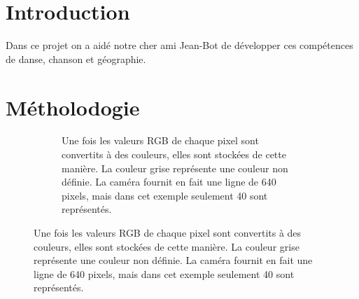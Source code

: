 \documentclass{article}
\begin{document}
    \thispagestyle{empty}

    \tableofcontents

    \newpage

    \setcounter{page}{1}

    \section{Introduction}

    Dans ce projet on a aidé notre cher ami Jean-Bot de développer ces compétences de danse, chanson et géographie.

    \section{Métholodogie}

    \begin{figure}[!ht]
        \centering
        \begin{subfigure}{\textwidth}
            \begin{center}
            \end{center}
            \caption{Une fois les valeurs RGB de chaque pixel sont convertits à des couleurs, elles sont stockées de cette manière. La couleur grise représente une couleur non définie. La caméra fournit en fait une ligne de 640 pixels, mais dans cet exemple seulement 40 sont représentés.}
        \end{subfigure}


\end{figure}
\end{document}

